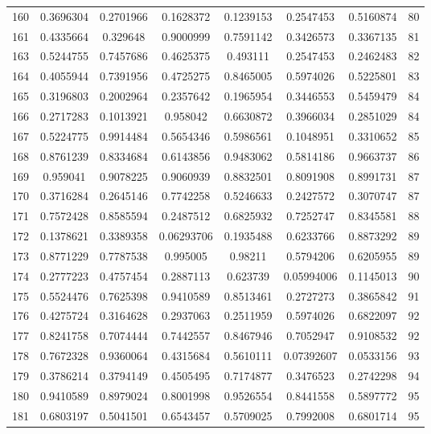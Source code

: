 \begin{anexosenv}
{\begin{longtable}{cccccccc}
160 & 0.3696304 & 0.2701966 & 0.1628372 & 0.1239153 & 0.2547453 & 0.5160874 & 80 \\ 
161 & 0.4335664 & 0.329648 & 0.9000999 & 0.7591142 & 0.3426573 & 0.3367135 & 81 \\ 
163 & 0.5244755 & 0.7457686 & 0.4625375 & 0.493111 & 0.2547453 & 0.2462483 & 82 \\ 
164 & 0.4055944 & 0.7391956 & 0.4725275 & 0.8465005 & 0.5974026 & 0.5225801 & 83 \\ 
165 & 0.3196803 & 0.2002964 & 0.2357642 & 0.1965954 & 0.3446553 & 0.5459479 & 84 \\ 
166 & 0.2717283 & 0.1013921 & 0.958042 & 0.6630872 & 0.3966034 & 0.2851029 & 84 \\ 
167 & 0.5224775 & 0.9914484 & 0.5654346 & 0.5986561 & 0.1048951 & 0.3310652 & 85 \\ 
168 & 0.8761239 & 0.8334684 & 0.6143856 & 0.9483062 & 0.5814186 & 0.9663737 & 86 \\ 
169 & 0.959041 & 0.9078225 & 0.9060939 & 0.8832501 & 0.8091908 & 0.8991731 & 87 \\ 
170 & 0.3716284 & 0.2645146 & 0.7742258 & 0.5246633 & 0.2427572 & 0.3070747 & 87 \\ 
171 & 0.7572428 & 0.8585594 & 0.2487512 & 0.6825932 & 0.7252747 & 0.8345581 & 88 \\ 
172 & 0.1378621 & 0.3389358 & 0.06293706 & 0.1935488 & 0.6233766 & 0.8873292 & 89 \\ 
173 & 0.8771229 & 0.7787538 & 0.995005 & 0.98211 & 0.5794206 & 0.6205955 & 89 \\ 
174 & 0.2777223 & 0.4757454 & 0.2887113 & 0.623739 & 0.05994006 & 0.1145013 & 90 \\ 
175 & 0.5524476 & 0.7625398 & 0.9410589 & 0.8513461 & 0.2727273 & 0.3865842 & 91 \\ 
176 & 0.4275724 & 0.3164628 & 0.2937063 & 0.2511959 & 0.5974026 & 0.6822097 & 92 \\ 
177 & 0.8241758 & 0.7074444 & 0.7442557 & 0.8467946 & 0.7052947 & 0.9108532 & 92 \\ 
178 & 0.7672328 & 0.9360064 & 0.4315684 & 0.5610111 & 0.07392607 & 0.0533156 & 93 \\ 
179 & 0.3786214 & 0.3794149 & 0.4505495 & 0.7174877 & 0.3476523 & 0.2742298 & 94 \\ 
180 & 0.9410589 & 0.8979024 & 0.8001998 & 0.9526554 & 0.8441558 & 0.5897772 & 95 \\ 
181 & 0.6803197 & 0.5041501 & 0.6543457 & 0.5709025 & 0.7992008 & 0.6801714 & 95 \\ 

\end{longtable}}
\end{anexosenv}
